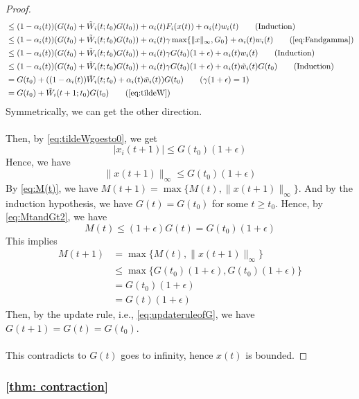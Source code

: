\begin{proof}
\begin{align*}
    &\le (1-\alpha_i(t))(G(t_0) + \tilde W_i(t;t_0)G(t_0)) + \alpha_i(t)F_i(x(t)) + \alpha_i(t)w_i(t)\tag{Induction}\\
    &\le (1-\alpha_i(t))(G(t_0) + \tilde W_i(t;t_0)G(t_0)) + \alpha_i(t)\gamma\max\{\|x\|_\infty,G_0\} + \alpha_i(t)w_i(t)\tag{\autoref{eq:Fandgamma}}\\
    &\le (1-\alpha_i(t))(G(t_0) + \tilde W_i(t;t_0)G(t_0)) + \alpha_i(t)\gamma G(t_0)(1+\epsilon)+ \alpha_i(t)w_i(t)\tag{Induction}\\
    &\le (1-\alpha_i(t))(G(t_0) + \tilde W_i(t;t_0)G(t_0)) + \alpha_i(t)\gamma G(t_0)(1+\epsilon)+ \alpha_i(t)\tilde w_i(t)G(t_0)\tag{Induction}\\
    & = G(t_0) + ((1-\alpha_i(t))\tilde W_i(t;t_0)+\alpha_i(t)\tilde w_i(t))G(t_0)\tag{$\gamma(1+\epsilon)=1$}\\
    & = G(t_0)+ \tilde W_i(t+1;t_0)G(t_0) \tag{\autoref{eq:tildeW}}
\end{align*}
Symmetrically, we can get the other direction.\\
\\
Then, by \autoref{eq:tildeWgoesto0}, we get
$$
|x_i(t+1)|\le G(t_0)(1+\epsilon)
$$
Hence, we have
$$
\|x(t+1)\|_\infty \le G(t_0)(1+\epsilon)
$$
By \autoref{eq:M(t)}, we have $M(t+1) = \max\{M(t), \|x(t+1)\|_\infty\}$. And by the induction hypothesis, we have $G(t) = G(t_0)$ for some $t\ge t_0$. Hence, by \autoref{eq:MtandGt2}, we have
$$
M(t) \le (1+\epsilon)G(t) = G(t_0)(1+\epsilon)
$$
This implies
\begin{align*}
    M(t+1) &= \max\{M(t),\|x(t+1)\|_\infty\}\\
    &\le \max\{G(t_0)(1+\epsilon), G(t_0)(1+\epsilon)\}\\
    &= G(t_0)(1+\epsilon)\\
    & = G(t)(1+\epsilon)
\end{align*}
Then, by the update rule, i.e., \autoref{eq:updateruleofG}, we have $G(t+1) = G(t) = G(t_0)$.\\
\\
This contradicts to $G(t)$ goes to infinity, hence $x(t)$ is bounded.
\end{proof}
\newpage
\subsubsection{\autoref{thm: contraction}}

